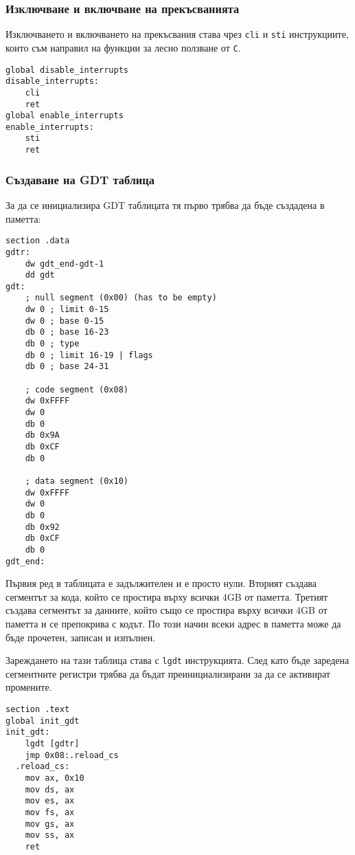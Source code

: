 \subsubsection{Изключване и включване на прекъсванията}
Изключването и включването на прекъсвания става чрез {\tt cli} и {\tt sti} инструкциите, които съм направил на функции за лесно ползване от {\tt C}.
\begin{lstlisting}
global disable_interrupts
disable_interrupts:
    cli
    ret
global enable_interrupts
enable_interrupts:
    sti
    ret
\end{lstlisting}

\subsubsection{Създаване на GDT таблица}
За да се инициализира GDT таблицата тя първо трябва да бъде създадена в паметта:
\begin{lstlisting}
section .data
gdtr:
    dw gdt_end-gdt-1
    dd gdt
gdt:
    ; null segment (0x00) (has to be empty)
    dw 0 ; limit 0-15
    dw 0 ; base 0-15
    db 0 ; base 16-23
    db 0 ; type
    db 0 ; limit 16-19 | flags
    db 0 ; base 24-31

    ; code segment (0x08)
    dw 0xFFFF
    dw 0
    db 0
    db 0x9A
    db 0xCF
    db 0

    ; data segment (0x10)
    dw 0xFFFF
    dw 0
    db 0
    db 0x92
    db 0xCF
    db 0
gdt_end:
\end{lstlisting}
Първия ред в таблицата е задължителен и е просто нули. Вторият създава сегментът за кода, който се простира върху всички 4GB от паметта. Третият създава сегментът за данните, който също се простира върху всички 4GB от паметта и се препокрива с кодът. По този начин всеки адрес в паметта може да бъде прочетен, записан и изпълнен.

Зареждането на тази таблица става с {\tt lgdt} инструкцията. След като бъде заредена сегментните регистри трябва да бъдат преинициализирани за да се активират промените.
\begin{lstlisting}
section .text
global init_gdt
init_gdt:
    lgdt [gdtr]
    jmp 0x08:.reload_cs
  .reload_cs:
    mov ax, 0x10
    mov ds, ax
    mov es, ax
    mov fs, ax
    mov gs, ax
    mov ss, ax
    ret
\end{lstlisting}

